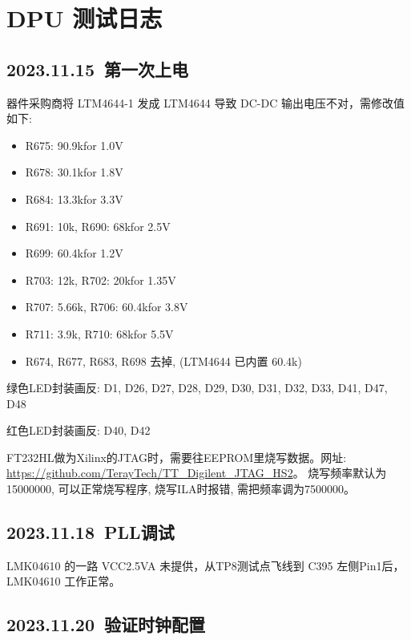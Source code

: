 
\chapter{DPU 测试日志}

\section{2023.11.15~第一次上电}

器件采购商将 LTM4644-1 发成 LTM4644 导致 DC-DC 输出电压不对，需修改值如下:
\begin{itemize}
  \item R675: 90.9k\qquad for 1.0V
  \item R678: 30.1k\qquad for 1.8V
  \item R684: 13.3k\qquad for 3.3V
  \item R691: 10k, R690: 68k\qquad for 2.5V
  \item R699: 60.4k\qquad for 1.2V
  \item R703: 12k, R702: 20k\qquad for 1.35V
  \item R707: 5.66k, R706: 60.4k\qquad for 3.8V
  \item R711: 3.9k, R710: 68k\qquad for 5.5V
  \item R674, R677, R683, R698 去掉, (LTM4644 已内置 60.4k)
\end{itemize}

绿色LED封装画反: D1, D26, D27, D28, D29, D30, D31, D32, D33, D41, D47, D48 \par
红色LED封装画反: D40, D42 \par
FT232HL做为Xilinx的JTAG时，需要往EEPROM里烧写数据。网址: \href{https://github.com/TerayTech/TT_Digilent_JTAG_HS2}{https://github.com/TerayTech/TT\_Digilent\_JTAG\_HS2}。 烧写频率默认为15000000, 可以正常烧写程序, 烧写ILA时报错, 需把频率调为7500000。\par

\section{2023.11.18~PLL调试}

LMK04610 的一路 VCC2.5VA 未提供，从TP8测试点飞线到 C395 左侧Pin1后，LMK04610 工作正常。

\section{2023.11.20~验证时钟配置}

